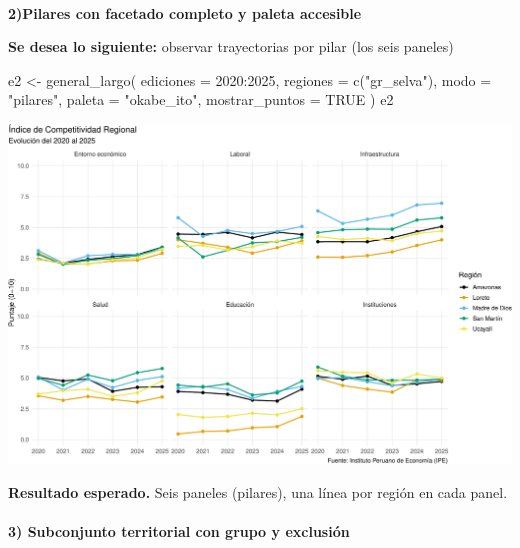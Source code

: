 \documentclass[
  11pt,
  letterpaper,
  DIV=11,
  numbers=noendperiod]{scrartcl}
\makeatletter
\let\oldparagraph\paragraph
\renewcommand{\paragraph}{
    \@ifstar
      \xxxParagraphStar
      \xxxParagraphNoStar
  }
\newcommand{\xxxParagraphStar}[1]{\oldparagraph*{#1}\mbox{}}
\newcommand{\xxxParagraphNoStar}[1]{\oldparagraph{#1}\mbox{}}
\newenvironment{Shaded}{\begin{snugshade}}{\end{snugshade}}
\newcommand{\AttributeTok}[1]{\textcolor[rgb]{0.40,0.45,0.13}{#1}}
\newcommand{\ConstantTok}[1]{\textcolor[rgb]{0.56,0.35,0.01}{#1}}
\newcommand{\DecValTok}[1]{\textcolor[rgb]{0.68,0.00,0.00}{#1}}
\newcommand{\FunctionTok}[1]{\textcolor[rgb]{0.28,0.35,0.67}{#1}}
\newcommand{\NormalTok}[1]{\textcolor[rgb]{0.00,0.23,0.31}{#1}}
\newcommand{\OtherTok}[1]{\textcolor[rgb]{0.00,0.23,0.31}{#1}}
\newcommand{\SpecialCharTok}[1]{\textcolor[rgb]{0.37,0.37,0.37}{#1}}
\newcommand{\StringTok}[1]{\textcolor[rgb]{0.13,0.47,0.30}{#1}}
\makeatother
\begin{document}
\paragraph{\texorpdfstring{\textbf{2)Pilares con facetado completo y
paleta
accesible}}{2)Pilares con facetado completo y paleta accesible}}\label{pilares-con-facetado-completo-y-paleta-accesible}

\textbf{Se desea lo siguiente:} observar trayectorias por pilar (los
seis paneles)

\begin{Shaded}
\begin{Highlighting}[]
\NormalTok{e2 }\OtherTok{\textless{}{-}} \FunctionTok{general\_largo}\NormalTok{(}
  \AttributeTok{ediciones =} \DecValTok{2020}\SpecialCharTok{:}\DecValTok{2025}\NormalTok{,}
  \AttributeTok{regiones  =} \FunctionTok{c}\NormalTok{(}\StringTok{"gr\_selva"}\NormalTok{),}
  \AttributeTok{modo      =} \StringTok{"pilares"}\NormalTok{,}
  \AttributeTok{paleta    =} \StringTok{"okabe\_ito"}\NormalTok{,}
  \AttributeTok{mostrar\_puntos =} \ConstantTok{TRUE}
\NormalTok{)}
\NormalTok{e2}
\end{Highlighting}
\end{Shaded}

\includegraphics{Manual_files/figure-pdf/unnamed-chunk-37-1.pdf}

\textbf{Resultado esperado.} Seis paneles (pilares), una línea por
región en cada panel.

\paragraph{\texorpdfstring{\textbf{3) Subconjunto territorial con grupo
y
exclusión}}{3) Subconjunto territorial con grupo y exclusión}}\label{subconjunto-territorial-con-grupo-y-exclusiuxf3n}
\end{document}

